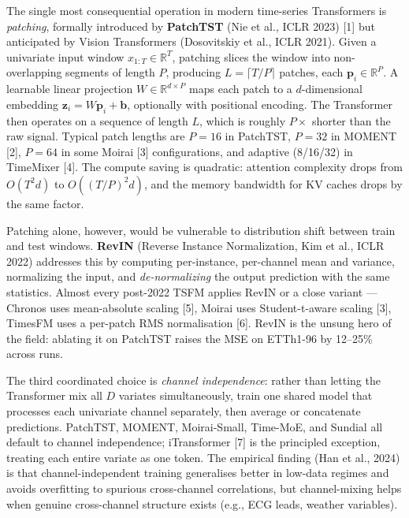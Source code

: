 The single most consequential operation in modern time-series Transformers is \emph{patching}, formally introduced by \textbf{PatchTST} (Nie et al., ICLR 2023) {[}1{]} but anticipated by Vision Transformers (Dosovitskiy et al., ICLR 2021). Given a univariate input window \(x_{1:T} \in \mathbb{R}^T\), patching slices the window into non-overlapping segments of length \(P\), producing \(L = \lceil T/P \rceil\) patches, each \(\mathbf{p}_i \in \mathbb{R}^P\). A learnable linear projection \(W \in \mathbb{R}^{d \times P}\) maps each patch to a \(d\)-dimensional embedding \(\mathbf{z}_i = W \mathbf{p}_i + \mathbf{b}\), optionally with positional encoding. The Transformer then operates on a sequence of length \(L\), which is roughly \(P\times\) shorter than the raw signal. Typical patch lengths are \(P=16\) in PatchTST, \(P=32\) in MOMENT {[}2{]}, \(P=64\) in some Moirai {[}3{]} configurations, and adaptive (8/16/32) in TimeMixer {[}4{]}. The compute saving is quadratic: attention complexity drops from \(O(T^2 d)\) to \(O((T/P)^2 d)\), and the memory bandwidth for KV caches drops by the same factor.

Patching alone, however, would be vulnerable to distribution shift between train and test windows. \textbf{RevIN} (Reverse Instance Normalization, Kim et al., ICLR 2022) addresses this by computing per-instance, per-channel mean and variance, normalizing the input, and \emph{de-normalizing} the output prediction with the same statistics. Almost every post-2022 TSFM applies RevIN or a close variant --- Chronos uses mean-absolute scaling {[}5{]}, Moirai uses Student-t-aware scaling {[}3{]}, TimesFM uses a per-patch RMS normalisation {[}6{]}. RevIN is the unsung hero of the field: ablating it on PatchTST raises the MSE on ETTh1-96 by 12--25\% across runs.

The third coordinated choice is \emph{channel independence}: rather than letting the Transformer mix all \(D\) variates simultaneously, train one shared model that processes each univariate channel separately, then average or concatenate predictions. PatchTST, MOMENT, Moirai-Small, Time-MoE, and Sundial all default to channel independence; iTransformer {[}7{]} is the principled exception, treating each entire variate as one token. The empirical finding (Han et al., 2024) is that channel-independent training generalises better in low-data regimes and avoids overfitting to spurious cross-channel correlations, but channel-mixing helps when genuine cross-channel structure exists (e.g., ECG leads, weather variables).

